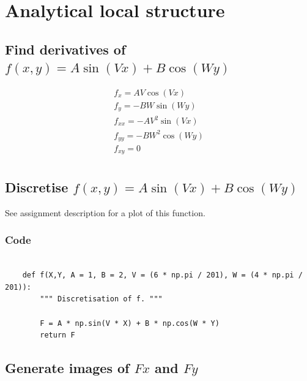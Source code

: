 \documentclass[abstract=true]{scrartcl}
\title{}
\author{Joris Stork, Lucas Swartsenburg}
\begin{document}
\maketitle


\section{Analytical local structure}

    \subsection{Find derivatives of $f(x,y)=A \sin(V x)+B \cos(W y)$}

        \begin{eqnarray}
            f_{x} = A V \cos(V x) \nonumber \\ 
            f_{y} = -B W \sin(W y) \nonumber \\
            f_{xx} = -A V^2 \sin(V x) \nonumber \\
            f_{yy} = -B W^2 \cos(W y) \nonumber \\
            f_{xy} = 0 \nonumber \\
        \end{eqnarray}

    \subsection{Discretise $f(x,y)=A \sin(V x)+B \cos(W y)$}

        See assignment description for a plot of this function.

        \subsubsection{Code}

        \begin{verbatim}
        
    def f(X,Y, A = 1, B = 2, V = (6 * np.pi / 201), W = (4 * np.pi / 201)):
        """ Discretisation of f. """
        
        F = A * np.sin(V * X) + B * np.cos(W * Y)
        return F

        \end{verbatim}

    \subsection{Generate images of $Fx$ and $Fy$}
\end{document}
